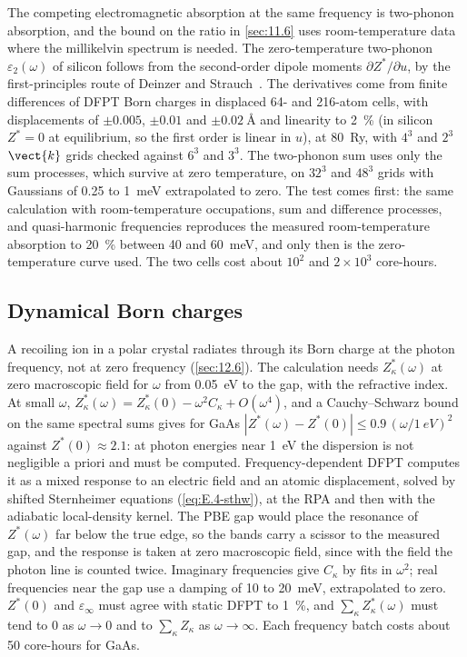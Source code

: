 The competing electromagnetic absorption at the same frequency is two-phonon absorption, and the bound on the ratio in \cref{sec:11.6} uses room-temperature data where the millikelvin spectrum is needed. The zero-temperature two-phonon $\varepsilon_2(\omega)$ of silicon follows from the second-order dipole moments $\partial Z^*/\partial u$, by the first-principles route of Deinzer and Strauch~\cite{deinzer2004two}. The derivatives come from finite differences of DFPT Born charges in displaced 64- and 216-atom cells, with displacements of $\pm0.005$, $\pm0.01$ and $\pm\SI{0.02}{\angstrom}$ and linearity to \SI{2}{\percent} (in silicon $Z^* = 0$ at equilibrium, so the first order is linear in $u$), at \SI{80}{Ry}, with $4^3$ and $2^3$ $\vect{k}$ grids checked against $6^3$ and $3^3$. The two-phonon sum uses only the sum processes, which survive at zero temperature, on $32^3$ and $48^3$ grids with Gaussians of 0.25 to \SI{1}{meV} extrapolated to zero. The test comes first: the same calculation with room-temperature occupations, sum and difference processes, and quasi-harmonic frequencies reproduces the measured room-temperature absorption to \SI{20}{\percent} between 40 and \SI{60}{meV}, and only then is the zero-temperature curve used. The two cells cost about $10^2$ and $2\times10^3$ core-hours.

\subsection{Dynamical Born charges}

A recoiling ion in a polar crystal radiates through its Born charge at the photon frequency, not at zero frequency (\cref{sec:12.6}). The calculation needs $Z^*_\kappa(\omega)$ at zero macroscopic field for $\omega$ from \SI{0.05}{eV} to the gap, with the refractive index. At small $\omega$, $Z^*_\kappa(\omega) = Z^*_\kappa(0) - \omega^2C_\kappa + O(\omega^4)$, and a Cauchy--Schwarz bound on the same spectral sums gives for GaAs $|Z^*(\omega) - Z^*(0)| \le 0.9\,(\omega/\SI{1}{eV})^2$ against $Z^*(0) \approx 2.1$: at photon energies near \SI{1}{eV} the dispersion is not negligible a priori and must be computed. Frequency-dependent DFPT computes it as a mixed response to an electric field and an atomic displacement, solved by shifted Sternheimer equations (\cref{eq:E.4-sthw}), at the RPA and then with the adiabatic local-density kernel. The PBE gap would place the resonance of $Z^*(\omega)$ far below the true edge, so the bands carry a scissor to the measured gap, and the response is taken at zero macroscopic field, since with the field the photon line is counted twice. Imaginary frequencies give $C_\kappa$ by fits in $\omega^2$; real frequencies near the gap use a damping of 10 to \SI{20}{meV}, extrapolated to zero. $Z^*(0)$ and $\varepsilon_\infty$ must agree with static DFPT to \SI{1}{\percent}, and $\sum_\kappa Z^*_\kappa(\omega)$ must tend to 0 as $\omega\to0$ and to $\sum_\kappa Z_\kappa$ as $\omega\to\infty$. Each frequency batch costs about 50 core-hours for GaAs.

